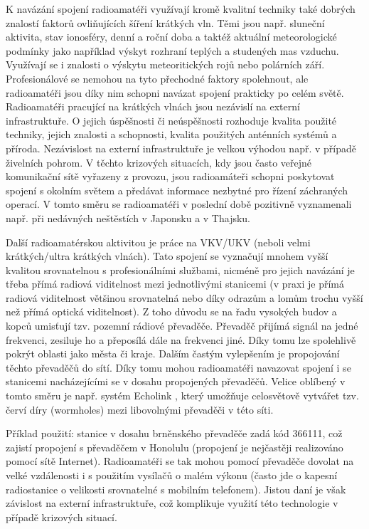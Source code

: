 K navázání spojení radioamatéři využívají kromě
kvalitní techniky také dobrých znalostí faktorů
ovliňujících šíření krátkých vln. Těmi jsou např. sluneční aktivita,
stav ionosféry, denní a roční doba a taktéž aktuální meteorologické podmínky
jako například výskyt
rozhraní teplých a studených mas vzduchu. Využívají se i znalosti o výskytu
meteoritických rojů nebo polárních září. Profesionálové se nemohou na tyto přechodné faktory spolehnout, ale 
radioamatéři jsou díky nim schopni navázat spojení prakticky po celém světě.
Radioamatéři pracující na krátkých vlnách jsou nezávislí na externí
infrastruktuře. O jejich úspěšnosti či neúspěšnosti rozhoduje kvalita použité techniky,
jejich znalosti a schopnosti, kvalita použitých anténních systémů a příroda. Nezávislost na externí infrastruktuře je velkou výhodou např. v
případě živelních pohrom. V těchto krizových situacích, kdy jsou často veřejné
komunikační sítě vyřazeny z provozu, jsou radioamáteři schopni poskytovat
spojení s okolním světem a předávat informace nezbytné pro řízení záchraných
operací. V tomto směru se radioamatéři v poslední době pozitivně vyznamenali
např. při nedávných neštěstích v Japonsku a v Thajsku. 

Další radioamatérskou aktivitou je práce na VKV/UKV (neboli velmi krátkých/ultra
krátkých vlnách). Tato spojení se vyznačují mnohem vyšší kvalitou srovnatelnou s
profesionálními službami, nicméně pro jejich navázání je třeba přímá radiová
viditelnost mezi jednotlivými stanicemi (v praxi je přímá radiová viditelnost
většinou srovnatelná nebo díky odrazům a lomům trochu vyšší než přímá optická
viditelnost).
Z toho důvodu se na řadu vysokých budov a kopců umisťují tzv. pozemní rádiové
převaděče. Převaděč přijímá signál na jedné frekvenci, zesiluje ho a přeposílá
dále na frekvenci jiné. Díky tomu lze spolehlivě pokrýt oblasti jako města či kraje.
Dalším častým vylepšením je propojování těchto převaděčů do sítí. Díky tomu mohou
radioamatéři navazovat spojení i se stanicemi nacházejícími se v dosahu
propojených převaděčů. Velice oblíbený v tomto směru je např. systém
Echolink \cite{echolink}, %
který umožňuje celosvětově vytvářet tzv. červí díry (wormholes) mezi libovolnými
převaděči v této síti.

Příklad použití: stanice v dosahu brněnského převaděče
zadá kód 366111, což zajistí propojení s převaděčem v Honolulu (propojení je
nejčastěji realizováno pomocí sítě Internet). Radioamatéři se tak mohou pomocí převaděče dovolat na velké vzdálenosti i s použitím vysílačů o malém výkonu
(často jde o kapesní radiostanice o velikosti srovnatelné s mobilním telefonem).
Jistou daní je však závislost na externí infrastruktuře, což komplikuje využití
této technologie v případě krizových situací.

